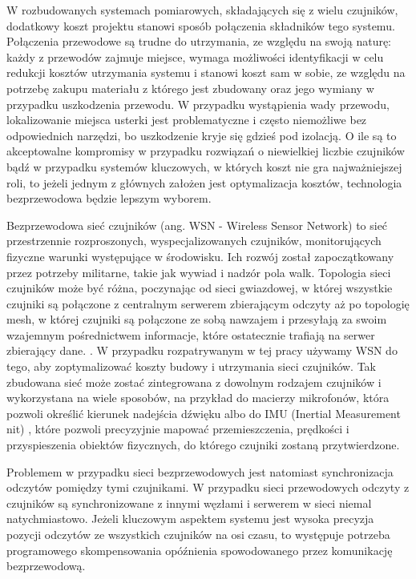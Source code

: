 \documentclass[12pt,oneside,a4paper]{book}
\theoremstyle{break}
\begin{document}
W rozbudowanych systemach pomiarowych, składających się z wielu czujników,
dodatkowy koszt projektu stanowi sposób połączenia składników tego systemu.
Połączenia przewodowe są trudne do utrzymania, ze względu na swoją naturę:
każdy z przewodów zajmuje miejsce, wymaga możliwości identyfikacji
w celu redukcji kosztów utrzymania systemu i stanowi koszt sam w sobie,
ze względu na potrzebę zakupu materiału z którego jest zbudowany oraz
jego wymiany w przypadku uszkodzenia przewodu. W przypadku wystąpienia wady przewodu,
lokalizowanie miejsca usterki jest problematyczne i często niemożliwe bez odpowiednich
narzędzi, bo uszkodzenie kryje się gdzieś pod izolacją. O ile są to
akceptowalne kompromisy w przypadku rozwiązań o niewielkiej liczbie
czujników bądź w przypadku systemów kluczowych, w których koszt nie
gra najważniejszej roli, to jeżeli jednym z głównych założen jest optymalizacja
kosztów, technologia bezprzewodowa będzie lepszym wyborem.
\par Bezprzewodowa sieć czujników (ang. WSN - Wireless Sensor Network)
to sieć przestrzennie
rozproszonych, wyspecjalizowanych czujników, monitorujących fizyczne
warunki występujące w środowisku. Ich rozwój został zapoczątkowany
przez potrzeby militarne, takie jak wywiad i nadzór pola walk. Topologia
sieci czujników może być różna, poczynając od sieci gwiazdowej, w której
wszystkie czujniki są połączone z centralnym serwerem zbierającym odczyty
aż po topologię mesh, w której czujniki są połączone ze sobą nawzajem i
przesyłają za swoim wzajemnym pośrednictwem informacje, które ostatecznie
trafiają na serwer zbierający dane. \cite{wikipedia-wsn}. W przypadku
rozpatrywanym w tej pracy używamy WSN do tego, aby zoptymalizować koszty
budowy i utrzymania sieci czujników. Tak zbudowana sieć może zostać
zintegrowana z dowolnym rodzajem czujników i wykorzystana na wiele
sposobów, na przykład do macierzy mikrofonów, która pozwoli określić
kierunek nadejścia dźwięku albo do IMU (Inertial Measurement nit) \cite{wikipedia-imu}, które pozwoli precyzyjnie
mapować przemieszczenia, prędkości i  przyspieszenia obiektów fizycznych,
do którego czujniki zostaną przytwierdzone.
\par Problemem w przypadku sieci
bezprzewodowych jest natomiast synchronizacja odczytów pomiędzy tymi
czujnikami. W przypadku sieci przewodowych  odczyty z czujników
są synchronizowane z innymi węzłami i serwerem w sieci niemal natychmiastowo.
Jeżeli kluczowym aspektem systemu jest wysoka precyzja pozycji
odczytów ze wszystkich czujników na osi czasu, to występuje potrzeba
programowego skompensowania opóźnienia spowodowanego przez komunikację
bezprzewodową.
\end{document}
